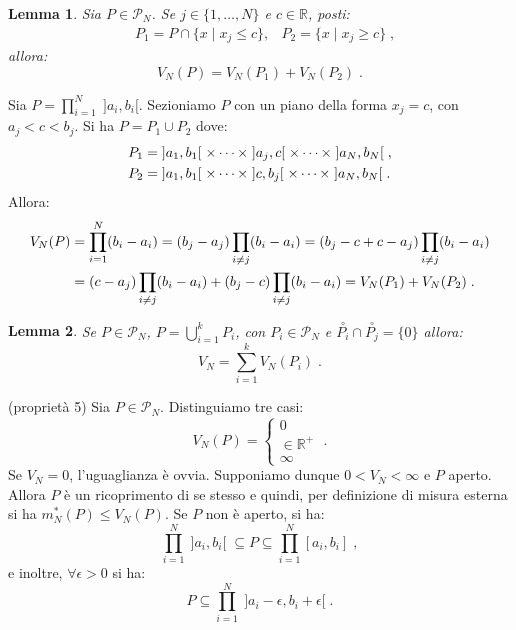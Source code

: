 \documentclass[a4paper,12pt]{report}
\theoremstyle{plain}
\newtheorem{lem}{Lemma}[section]
\theoremstyle{definition}
\theoremstyle{remark}
\numberwithin{equation}{section}
\begin{document}
\begin{lem} Sia $P \in \mathcal{P}_N$. Se $j \in \{1,\ldots,N\}$ e $c \in \mathbb{R}$, posti:
\begin{align}
&P_1= P\cap\{x\;|\; x_j\le c\}, &P_2=\{x\;|\;x_j\ge c\}\;,
\end{align}
allora:
\begin{equation}
V_N(P)=V_N(P_1)+V_N(P_2)\;.
\end{equation}
\end{lem}
\proof Sia $P=\prod_{i=1}^N\;]a_i,b_i[$. Sezioniamo $P$ con un piano della forma $x_j=c$, con $a_j<c<b_j$. Si ha $P=P_1 \cup P_2$ dove:
\begin{align}
P_1 &=\;]a_1,b_1[\;\times \cdots \times \;]a_j,c[\;\times \cdots \times \;]a_N,b_N[ \;,\notag \\
P_2 &= \;]a_1,b_1[\;\times \cdots\times \;]c,b_j[\; \times \cdots \times \;]a_N,b_N[\;.
\end{align}
Allora:
\begin{align}
V_N(P) &= \prod_{i=1}^N(b_i-a_i)=(b_j-a_j)\prod_{i\ne j} (b_i-a_i)=(b_j-c+c-a_j)\prod_{i\ne j}(b_i-a_i) \notag \\
&=(c-a_j)\prod_{i\ne j}(b_i-a_i)+(b_j-c)\prod_{i\ne j}(b_i-a_i)=V_N(P_1)+V_N(P_2)\;.
\end{align}
\endproof
\begin{lem} Se $P \in \mathcal{P}_N$, $P=\bigcup_{i=1}^k P_i$, con $P_i \in \mathcal{P}_N$ e $\stackrel{\circ}{P_i} \cap \stackrel{\circ}{P_j}=\{0\}$ allora:
\begin{equation}
V_N=\sum_{i=1}^k V_N(P_i)\;.
\end{equation}
\end{lem}
\proof (proprietà 5) Sia $P \in \mathcal{P}_N$. Distinguiamo tre casi:
\begin{equation}
V_N(P)=\begin{cases}
        0 \\
\in \mathbb{R}^+ \\
\infty
       \end{cases}\;.
\end{equation}
Se $V_N=0$, l'uguaglianza è ovvia. Supponiamo dunque $0<V_N<\infty$ e $P$ aperto. Allora $P$ è un ricoprimento di se stesso e quindi, per definizione di misura esterna si ha $m_N^*(P) \le V_N(P)$. Se $P$ non è aperto, si ha:
\begin{equation}
\prod_{i=1}^N\;]a_i,b_i[\;\subseteq P \subseteq \prod_{i=1}^N [a_i,b_i]\;,
\end{equation}
e inoltre, $\forall \epsilon>0$ si ha:
\begin{equation}
P \subseteq \prod_{i=1}^N \;]a_i-\epsilon,b_i+\epsilon[\;.
\end{equation}
\end{document}
